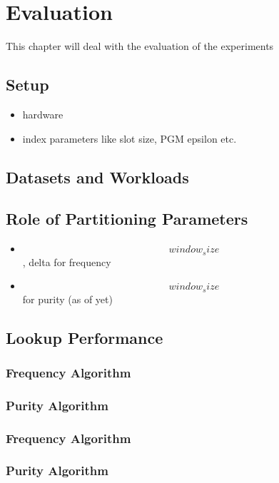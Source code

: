 \thispagestyle{plain}
\chapter{Evaluation}

This chapter will deal with the evaluation of the experiments

\section{Setup}
\begin{itemize}
    \item hardware
    \item index parameters like slot size, PGM epsilon etc.
\end{itemize}

\section{Datasets and Workloads}

\section{Role of Partitioning Parameters}
\begin{itemize}
    \item $$window_size$$, delta for frequency
    \item $$window_size$$ for purity (as of yet)
\end{itemize}

\section{Lookup Performance}

\subsection{Frequency Algorithm}

\subsection{Purity Algorithm}

\subsection{Frequency Algorithm}

\subsection{Purity Algorithm}